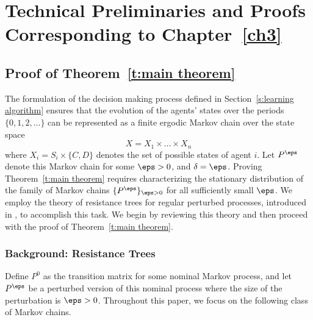 \chapter{Technical Preliminaries and Proofs Corresponding to Chapter~\ref{ch3}}

\section{Proof of Theorem~\ref{t:main theorem}}

The formulation of the decision making process defined in Section~\ref{s:learning algorithm} ensures that the evolution of the agents' states over the periods $\{0, 1, 2, \dots\}$ can be represented as a finite ergodic Markov chain over the state space
%
\begin{equation}
X = X_1 \times \dots \times X_n
\end{equation}
%
where $X_i = S_i\times \{C,D\}$ denotes the set of possible states of agent $i$.  Let $P^\eps$ denote this Markov chain for some $\eps > 0$, and $\delta = \eps$.  Proving Theorem~\ref{t:main theorem} requires characterizing the stationary distribution of the family of Markov chains $\{P^\eps\}_{\eps > 0}$ for all sufficiently small $\eps$.  We employ the theory of resistance trees for regular perturbed processes, introduced in \cite{Young1993}, to accomplish this task.  We begin by reviewing this theory and then proceed with the proof of Theorem~\ref{t:main theorem}.



\subsection{Background: Resistance Trees}\label{a:resistance trees}

Define $P^0$ as the transition matrix for some nominal Markov process, and let $P^{\eps}$ be a perturbed version of this nominal process where the size of the perturbation is $\eps > 0$.  Throughout this paper, we focus on the following class of Markov chains.  


